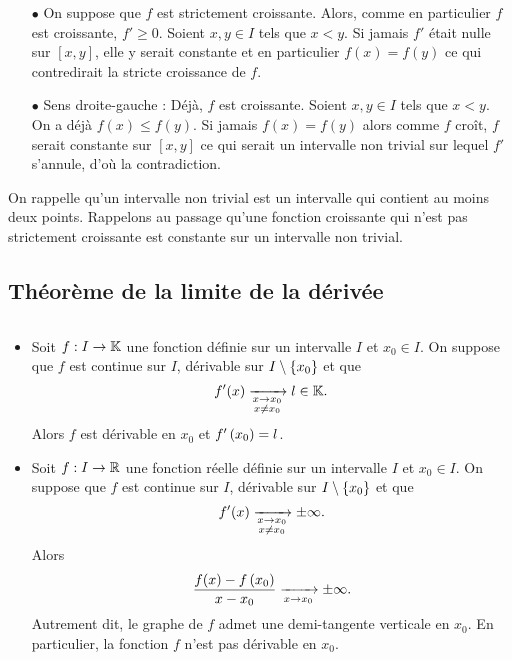 \documentclass{magnolia}
\begin{document}
\begin{preuve}
\begin{itemize}
\item[$\bullet$] On suppose que $f$ est strictement croissante. Alors, comme en particulier $f$ est croissante, $f'\geq 0$. Soient $x,y \in I$ tels que $x<y$. Si jamais $f'$ était nulle sur $[x,y]$, elle y serait constante et en particulier $f(x)=f(y)$ ce qui contredirait la stricte croissance de $f$.
\item[$\bullet$] Sens droite-gauche : Déjà, $f$ est croissante. Soient $x,y \in I$ tels que $x<y$. On a déjà $f(x)\leq f(y)$. Si jamais $f(x)=f(y)$ alors comme $f$ croît, $f$ serait constante sur $[x,y]$ ce qui serait un intervalle non trivial sur lequel $f'$ s'annule, d'où la contradiction.
\end{itemize}

\end{preuve}

\begin{remarques}
\remarque On rappelle qu'un intervalle non trivial est un intervalle qui contient au moins deux points.
\remarque Rappelons au passage qu'une fonction croissante qui n'est pas
  strictement croissante est constante sur un intervalle non trivial.
\end{remarques}


\subsection{Théorème de la limite de la dérivée}

\begin{proposition}[utile=-3]
$\quad$
\begin{itemize}
\item Soit $f:I\to\mathbb{K}$ une fonction définie sur
  un intervalle $I$ et $x_0\in I$. On suppose que $f$ est continue sur $I$,
  dérivable sur $I\setminus\left\{x_0\right\}$ et que
  \[f'(x)\xrightarrow[ \substack{x\rightarrow x_0 \\ x\not=x_0}]{} l\in\mathbb{K}.\]
  Alors $f$ est dérivable en $x_0$ et $f'\left(x_0\right)=l$.
\item Soit $f:I\to\mathbb{R}$ une fonction réelle définie sur un intervalle
  $I$ et $x_0\in I$. On suppose que $f$ est continue sur $I$, dérivable sur
  $I\setminus\left\{x_0\right\}$
  et que
  \[f'(x)\xrightarrow[ \substack{x\rightarrow x_0 \\ x\not=x_0}]{} \pm\infty.\]
  Alors
  \[\frac{f(x)-f\left(x_0\right)}{x-x_0} \xrightarrow[x\rightarrow x_0]{} \pm\infty.\]
  Autrement dit, le graphe de $f$ admet une demi-tangente verticale en $x_0$.
  En particulier, la fonction $f$ n'est pas dérivable en $x_0$.
\end{itemize}
\end{proposition}
\end{document}
